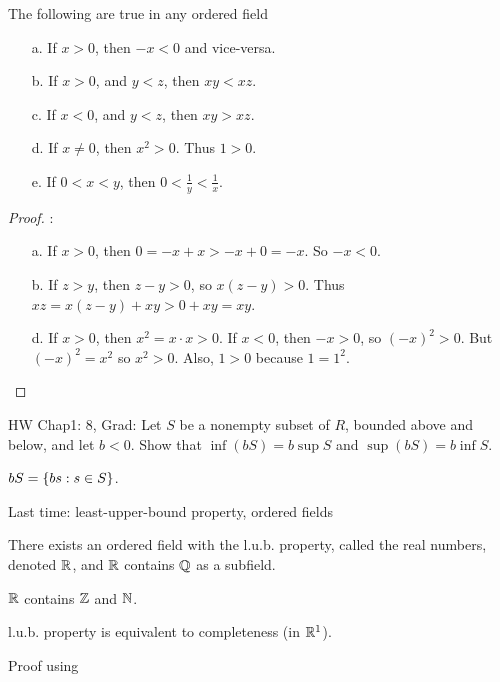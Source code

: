 \documentclass[]{article}
\begin{document}
\begin{theorem}
	The following are true in any ordered field
	\begin{itemize}
		\item[a.] If $x>0$, then $-x<0$ and vice-versa.
		\item[b.] If $x>0$, and $y<z$, then $xy<xz$.
		\item[c.] If $x<0$, and $y<z$, then $xy>xz$.
		\item[d.] If $x\neq0$, then $x^2>0$. Thus $1>0$.
		\item[e.] If $0<x<y$, then $0<\frac1y<\frac1x$.
	\end{itemize}
\end{theorem}
\begin{proof}:
	\begin{itemize}
		\item[a.] If $x>0$, then $0=-x+x>-x+0=-x$. So $-x<0$.
		\item[b.] If $z>y$, then $z-y>0$, so $x(z-y)>0$. Thus $xz=x(z-y)+xy>0+xy=xy$.
		\item[d.] If $x>0$, then $x^2=x\cdot x>0$. If $x<0$, then $-x>0$, so $(-x)^2>0$.
			But $(-x)^2=x^2$ so $x^2>0$. Also, $1>0$ because $1=1^2$.
	\end{itemize}
\end{proof}

HW Chap1: 8, Grad: Let $S$ be a nonempty subset of $R$, bounded above and below, and let $b<0$. Show that $\inf(bS) = b\sup S$ and $\sup(bS) = b\inf S$.

\begin{note}
	$bS = \left\{ bs : s\in S \right\}$.
\end{note}

Last time: least-upper-bound property, ordered fields

\begin{theorem}
	There exists an ordered field with the l.u.b. property, called the real numbers, denoted $\mathbb{R}$, and $\mathbb{R}$ contains $\mathbb{Q}$ as a subfield.
\end{theorem}
\begin{note}
	$\mathbb{R}$ contains $\mathbb{Z}$ and $\mathbb{N}$.
\end{note}
\begin{note}
	l.u.b. property is equivalent to completeness (in $\mathbb{R}^1$).
\end{note}
\begin{note}
	Proof using 
\end{note}
\end{document}
